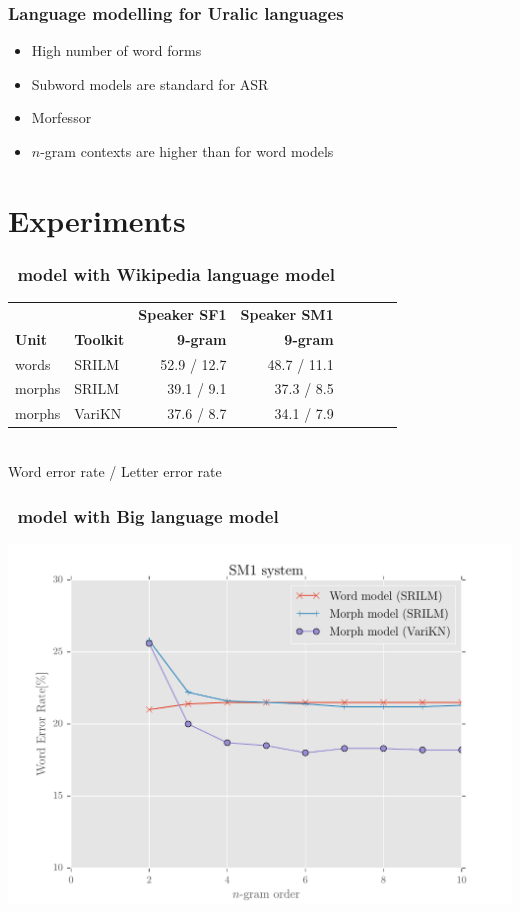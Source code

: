 \begin{frame}
\frametitle{Language modelling for Uralic languages}
\begin{itemize}
\item High number of word forms
\item Subword models are standard for ASR
\item Morfessor
\item $n$-gram contexts are higher than for word models
\end{itemize}
\end{frame}


\section{Experiments}
\begin{frame}
\frametitle{\ns\ model with Wikipedia language model}

\begin{tabular}{ll|rrr|rrr}
& & \textbf{Speaker SF1} & \textbf{Speaker SM1} \\
 \textbf{Unit} & \textbf{Toolkit} & \textbf{9-gram} & \textbf{9-gram}\\\hline
 words & SRILM & 52.9 / 12.7&  48.7 / 11.1\\
morphs & SRILM & 39.1 / 9.1 &  37.3 / 8.5 \\
 morphs & VariKN   & 37.6 / 8.7 & 34.1 / 7.9 \\

\end{tabular}
\\[1cm]
Word error rate / Letter error rate\\
\end{frame}

\begin{frame}
\frametitle{\ns\ model with Big language model}
\includegraphics[width=.86\textwidth]{../figures/sme1}

\end{frame}

